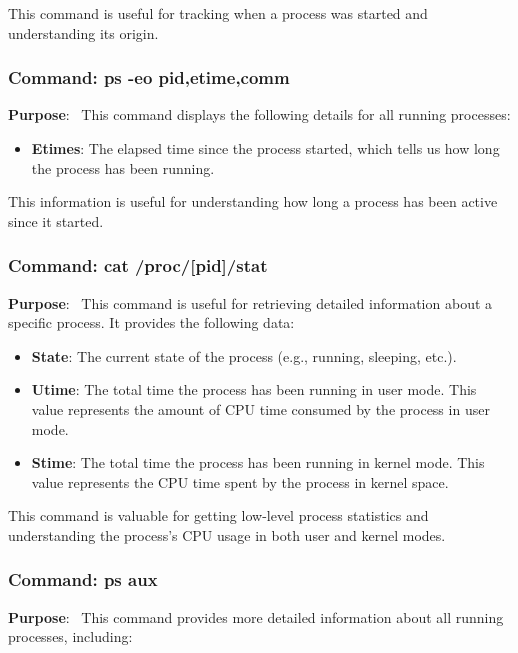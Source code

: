 \documentclass[12pt]{article}
\begin{document}
This command is useful for tracking when a process was started and understanding its origin.

\subsubsection{Command: ps -eo pid,etime,comm}

\textbf{Purpose}: \
This command displays the following details for all running processes:

\begin{itemize}
    \item \textbf{Etimes}: The elapsed time since the process started, which tells us how long the process has been running.
\end{itemize}

This information is useful for understanding how long a process has been active since it started.

\subsubsection{Command: cat /proc/[pid]/stat}

\textbf{Purpose}: \
This command is useful for retrieving detailed information about a specific process. It provides the following data:

\begin{itemize}
    \item \textbf{State}: The current state of the process (e.g., running, sleeping, etc.).
    \item \textbf{Utime}: The total time the process has been running in user mode. This value represents the amount of CPU time consumed by the process in user mode.
    \item \textbf{Stime}: The total time the process has been running in kernel mode. This value represents the CPU time spent by the process in kernel space.
\end{itemize}

This command is valuable for getting low-level process statistics and understanding the process's CPU usage in both user and kernel modes.

\subsubsection{Command: ps aux}

\textbf{Purpose}: \
This command provides more detailed information about all running processes, including:
\end{document}
